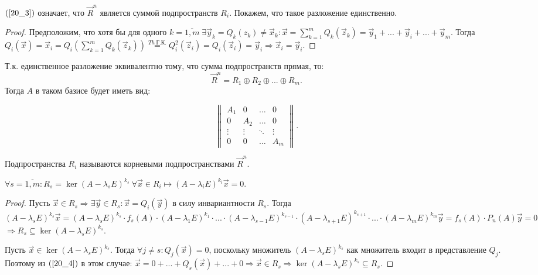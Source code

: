 $(\ref{20_3})$ означает, что $\vec{R}^n$ является суммой подпространств $R_i$. Покажем, что такое разложение единственно.
\begin{proof}
	Предположим, что хотя бы для одного $k = \overline{1,m} \; \exists \vec{y}_k = Q_k(z_k) \neq \vec{x}_k : \vec{x} = \sum\limits_{k=1}^m{Q_k(\vec{z}_k)} = \vec{y}_1 + ... + \vec{y}_i + ... + \vec{y}_m$. Тогда $Q_i(\vec{x}) = \vec{x}_i = Q_i \left(\sum\limits_{k=1}^m{Q_k(\vec{z}_k)}\right) \stackrel{Th~ \text{Г.К.}}{=} Q_i^2(\vec{z}_i) = Q_i(\vec{z}_i) = \vec{y}_i \Rightarrow \vec{x}_i = \vec{y}_i.$
\end{proof}

Т.к. единственное разложение эквивалентно тому, что сумма подпространств прямая, то:
\[\vec{R}^n = R_1 \oplus R_2 \oplus ... \oplus R_m.\]
Тогда $A$ в таком базисе будет иметь вид:

\begin{equation*}
	\begin{Vmatrix}
		A_1 	 &  0      & \ldots & 0   	 \\
		0      &  A_2    & \ldots & 0   	 \\
		\vdots &  \vdots & \ddots & \vdots \\
		0   	 &   0     & \ldots & A_m
	\end{Vmatrix}.
\end{equation*}

Подпространства $R_i$ называются корневыми подпространствами $\vec{R}^n$.

\begin{theorem}
	$\forall s = \overline{1,m} : R_s = \ker(A - \lambda_s E)^{k_s}~ \forall \vec{x} \in R_i \longmapsto (A - \lambda_i E)^{k_i} \vec{x} = 0$.
	\begin{proof}
		Пусть $\vec{x} \in R_s \Rightarrow \exists \vec{y} \in R_s : \vec{x} = Q_i(\vec{y})$ в силу инвариантности $R_s$. Тогда $(A - \lambda_s E)^{k_s} \vec{x} = (A - \lambda_s E)^{k_s} \cdot f_s(A) \cdot (A - \lambda_1 E)^{k_1} \cdot ... \cdot (A - \lambda_{s-1} E)^{k_{s-1}} \cdot (A - \lambda_{s+1} E)^{k_{s+1}} \cdot ... \cdot (A - \lambda_m E)^{k_m} \vec{y} = f_s(A) \cdot P_n(A)\vec{y} = 0$
		$ \Rightarrow R_s \subseteq \ker(A - \lambda_s E) ^ {k_s}$.
		
		Пусть $\vec{x} \in \ker(A - \lambda_s E)^{k_s}$. Тогда $\forall j \neq s: Q_j(\vec{x}) = 0$, поскольку множитель $(A - \lambda_s E)^{k_s}$ как множитель входит в представление $Q_j$. Поэтому из $(\ref{20_4})$ в этом случае: $\vec{x} = 0 + ... + Q_s(\vec{x}) + ... + 0 \Rightarrow \vec{x} \in R_s \Rightarrow \ker(A-\lambda_s E)^{k_s} \subseteq R_s.$
	\end{proof}
\end{theorem}

